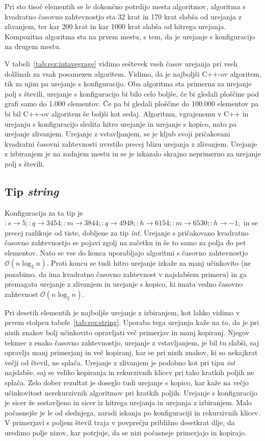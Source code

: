 \documentclass[a4paper,oneside,12pt]{article}
\newcommand{\lra}{\ensuremath{\longrightarrow}}
\begin{document}
Pri sto tisoč elementih se le dokončno potrdijo mesta algoritmov,
algoritma s kvadratno časovno zahtevnostjo sta 32 krat
in 170 krat slabša od urejanja z zlivanjem, ter kar 200 krat in kar 1000 krat slabša od hitrega 
urejanja. Kompozitna algoritma sta na prvem mestu, s tem, da je urejanje s
konfiguracijo na drugem mestu.

V tabeli~\ref{tab:rez:intavegrage} vidimo seštevek vseh časov urejanja pri vseh
dolžinah za vsak posamezen algoritem. Vidimo, da je najboljši \mbox{C++-ov} algoritem,
tik za njim pa urejanje s konfiguracijo. Oba algoritma sta primerna za urejanje
polj s števili, urejanje s konfiguracijo bi bilo celo boljše, če bi gledali
ploščine pod grafi samo do 1.000 elementov. Če pa bi gledali ploščine do 100.000
elementov pa bi bil \mbox{C++-ov} algoritem še boljši kot sedaj. 
Algoritmu, vgrajenemu v C++ in urejanju s konfiguracijo sledita hitro urejanje in urejanje
s kopico, nato pa urejanje zlivanjem. Urejanje z vstavljanjem, se je kljub svoji
pričakovani kvadratni časovni zahtevnosti uvrstilo precej blizu urejanja z
zlivanjem. Urejanje z izbiranjem je na zadnjem mestu in se je izkazalo skrajno 
neprimerno za urejanje polj s števili. 


\subsection{Tip \emph{string}}
Konfiguracija za ta tip je $:s \lra 5;:q \lra 3454;:m \lra 3844;:q \lra 4948;:h
\lra 6154;:m \lra 6530;:h \lra -1;$
in se precej razlikuje od tiste, dobljene za tip \emph{int}. Urejanje
s pričakovano kvadratno časovno zahtevnostjo se pojavi zgolj na začetku in še to samo za 
polja do pet elementov. Nato se vse do konca uporabljajo algoritmi s časovno zahtevnostjo 
$\mathcal{O}(n\log_2n)$. Proti koncu se tudi hitro urejanje izkaže za manj učinkovito (ne 
pozabimo, da ima kvadratno časovno zahtevnost v najslabšem primeru) in ga premagata urejanje
z zlivanjem in urejanje s kopico, ki imata vedno časovno zahtevnost $\mathcal{O}(n\log_2n)$. 

Pri desetih elementih je najboljše urejanje z izbiranjem, kot lahko vidimo v
prvem stolpcu tabele~\ref{tab:rez:string}.
Uporaba tega urejanja kaže na to, da je pri nizih znakov bolj učinkovito opravljati več
primerjav in manj kopiranj. Njegov tekmec z enako časovno zahtevnostjo, urejanje z 
vstavljanjem, je bil tu slabši, saj opravlja manj primerjanj in več kopiranj, kar se pri
nizih znakov, ki so nekajkrat večji od števil, ne splača. Urejanje z zlivanjem je podobno
kot pri tipu \emph{int} najslabše, saj se veliko kopiranja in rekurzivnih klicev pri tako 
kratkih poljih ne splača. Zelo dober rezultat je doseglo tudi urejanje s kopico, kar kaže 
na večjo učinkovitost nerekurzivnih algoritmov pri kratkih poljih. Urejanje s konfiguracijo
je sicer že sestavljeno in sicer iz hitrega urejanja in urejanja z izbiranjem. Malo počasnejše 
je le od slednjega, zaradi iskanja po konfiguraciji in rekurzivnih klicev.
V primerjavi s poljem števil traja v povprečju približno desetkrat dlje, da uredimo polje nizov,
kar potrjuje, da se nizi počasneje primerjajo in kopirajo.
\end{document}
